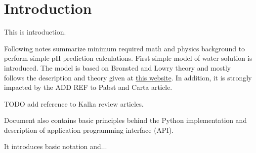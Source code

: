 \section{Introduction}

This is introduction.

Following notes summarize minimum required math and physics background to perform simple pH
prediction calculations. First simple model of water solution is introduced.
The model is based on Bronsted and Lowry theory and mostly follows the description and theory
given at \href{https://www.aqion.de/site/100}{this website}. In addition, it is strongly
impacted by the ADD REF to Pabst and Carta article.

TODO add reference to Kalka review articles.

Document also contains basic principles behind the Python implementation and description
of application programming interface (API).


It introduces basic notation and...